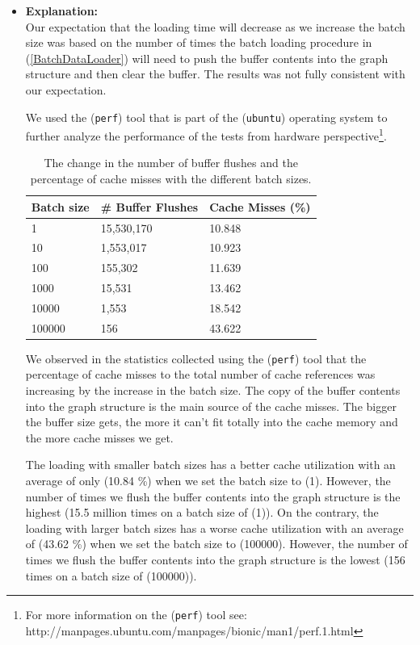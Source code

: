 {\begin{itemize}
\item \textbf{Explanation:}\\
Our expectation that the loading time will decrease as we increase the batch size was based on the number of times the batch loading procedure in (\ref{BatchDataLoader}) will need to push the buffer contents into the graph structure and then clear the buffer. The results was not fully consistent with our expectation.

We used the (\texttt{perf}) tool that is part of the (\texttt{ubuntu}) operating system to further analyze the performance of the tests from hardware perspective\footnote{For more information on the (\texttt{perf}) tool see: http://manpages.ubuntu.com/manpages/bionic/man1/perf.1.html}.\\


\begin{table}[H]
\centering
\begin{tabular}{@{}|l|l|l|@{}}
\toprule
Batch size & \# Buffer Flushes & Cache Misses (\%) \\ \midrule
1 & 15,530,170 & 10.848 \\ \midrule
10 & 1,553,017 & 10.923 \\ \midrule
100 & 155,302 & 11.639 \\ \midrule
1000 & 15,531 & 13.462 \\ \midrule
10000 & 1,553 & 18.542 \\ \midrule
100000 & 156 & 43.622 \\ \bottomrule
\end{tabular}
\caption{The change in the number of buffer flushes and the percentage of cache misses with the different batch sizes.}
\label{tbl:perf-analysis}
\end{table}

We observed in the statistics collected using the (\texttt{perf}) tool that the percentage of cache misses to the total number of cache references was increasing by the increase in the batch size. The copy of the buffer contents into the graph structure is the main source of the cache misses. The bigger the buffer size gets, the more it can't fit totally into the cache memory and the more cache misses we get.

The loading with smaller batch sizes has a better cache utilization with an average of only (10.84 \%) when we set the batch size to (1). However, the number of times we flush the buffer contents into the graph structure is the highest (15.5 million times on a batch size of (1)). On the contrary, the loading with larger batch sizes has a worse cache utilization with an average of (43.62 \%) when we set the batch size to (100000). However, the number of times we flush the buffer contents into the graph structure is the lowest (156 times on a batch size of (100000)).


\end{itemize}}
